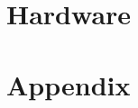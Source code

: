 \documentclass[a4paper]{article}
\begin{document}
\section{Hardware}









\section*{Appendix}







\end{document}
